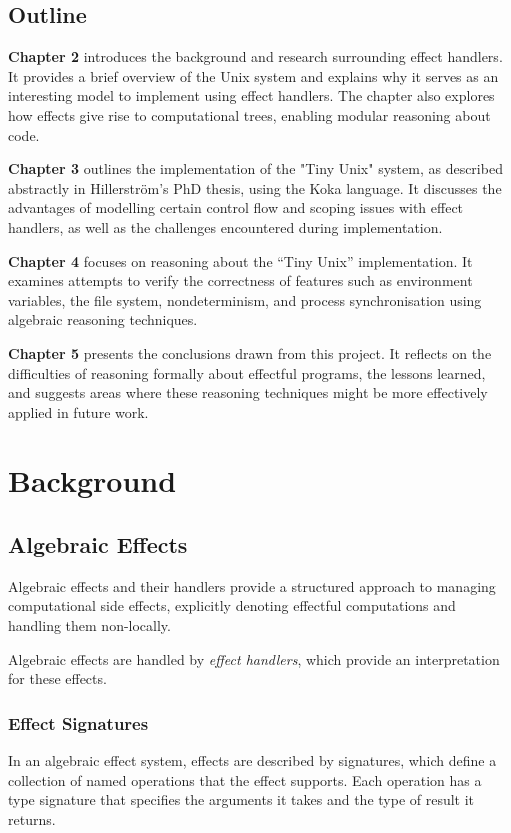\documentclass[logo,bsc,singlespacing,parskip]{infthesis}
\begin{document}
\section{Outline}

\textbf{Chapter 2} introduces the background and research surrounding effect handlers. It provides a brief overview of the Unix system and explains why it serves as an interesting model to implement using effect handlers. The chapter also explores how effects give rise to computational trees, enabling modular reasoning about code.

\textbf{Chapter 3} outlines the implementation of the "Tiny Unix" system, as described abstractly in Hillerström's PhD thesis, using the Koka language. It discusses the advantages of modelling certain control flow and scoping issues with effect handlers, as well as the challenges encountered during implementation.

\textbf{Chapter 4} focuses on reasoning about the “Tiny Unix” implementation. It examines attempts to verify the correctness of features such as environment variables, the file system, nondeterminism, and process synchronisation using algebraic reasoning techniques.

\textbf{Chapter 5} presents the conclusions drawn from this project. It reflects on the difficulties of reasoning formally about effectful programs, the lessons learned, and suggests areas where these reasoning techniques might be more effectively applied in future work.


\chapter{Background}

\section{Algebraic Effects}

Algebraic effects \cite{plotkin_handling_2013} and their handlers \cite{pretnar_introduction_2015} provide a structured approach to managing computational side effects, explicitly denoting effectful computations and handling them non-locally.

Algebraic effects are handled by \textit{effect handlers}, which provide an interpretation for these effects.

\subsection{Effect Signatures}
In an algebraic effect system, effects are described by signatures, which define a collection of named operations that the effect supports. Each operation has a type signature that specifies the arguments it takes and the type of result it returns.
\end{document}
